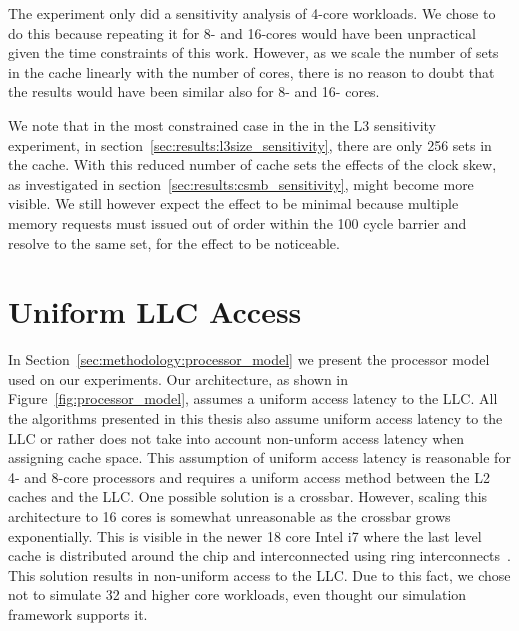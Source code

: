 The experiment only did a sensitivity analysis of 4-core workloads. 
We chose to do this because repeating it for 8- and 16-cores would have been unpractical given the time constraints of this work. 
However, as we scale the number of sets in the cache linearly with the number of cores, there is no reason to doubt that the results would have been similar also for 8- and 16- cores.

We note that in the most constrained case in the in the L3 sensitivity experiment, in section~\ref{sec:results:l3size_sensitivity}, there are only 256 sets in the cache.
With this reduced number of cache sets the effects of the clock skew, as investigated in section~\ref{sec:results:csmb_sensitivity}, might become more visible.
We still however expect the effect to be minimal because multiple memory requests must issued out of order within the 100 cycle barrier and resolve to the same set, for the effect to be noticeable.


\section{Uniform LLC Access}

In Section~\ref{sec:methodology:processor_model} we present the processor model used on our experiments.
Our architecture, as shown in Figure~\ref{fig:processor_model}, assumes a uniform access latency to the LLC.
All the algorithms presented in this thesis also assume uniform access latency to the LLC or rather does not take into account non-unform access latency when assigning cache space.
This assumption of uniform access latency is reasonable for 4- and 8-core processors and requires a uniform access method between the L2 caches and the LLC.
One possible solution is a crossbar.
However, scaling this architecture to 16 cores is somewhat unreasonable as the crossbar grows exponentially.
This is visible in the newer 18 core Intel i7 where the last level cache is distributed around the chip and interconnected using ring interconnects~\cite{Hruska2014}.
This solution results in non-uniform access to the LLC.
Due to this fact, we chose not to simulate 32 and higher core workloads, even thought our simulation framework supports it.